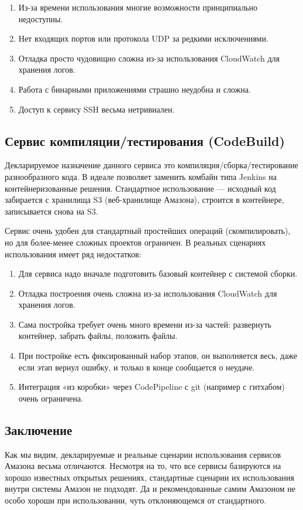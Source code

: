 \documentclass[10pt, a5paper]{article}
\begin{document}
\begin{enumerate}
\item Из-за времени использования многие возможности принципиально
  недоступны.
\item Нет входящих портов или протокола UDP за редкими исключениями.
\item Отладка просто чудовищно сложна из-за использования \linebreak CloudWatch для
  хранения логов.
\item Работа с бинарными приложениями страшно неудобна и сложна.
\item Доступ к сервису SSH весьма нетривиален.
\end{enumerate}

\subsection*{Сервис компиляции/тестирования (CodeBuild)}

Декларируемое назначение данного сервиса это
компиляция/сборка/тестирование разнообразного кода. В идеале позволяет
заменить комбайн типа Jenkins на контейнеризованные решения. Стандартное
использование --- исходный код забирается с хранилища S3 (веб-хранилище
Амазона), строится в контейнере, записывается снова на S3.

Сервис очень удобен для стандартный простейших операций (скомпилировать),
но для более-менее сложных проектов ограничен. В реальных сценариях
использования имеет ряд недостатков:

\begin{enumerate}
\item Для сервиса надо вначале подготовить базовый контейнер с системой
  сборки.
\item Отладка построения очень сложна из-за использования \linebreak CloudWatch для
  хранения логов.
\item Сама постройка требует очень много времени из-за частей: развернуть
  контейнер, забрать файлы, положить файлы.
\item При постройке есть фиксированный набор этапов, он выполняется весь,
  даже если этап вернул ошибку, и только в конце сообщается о неудаче.
\item Интеграция «из коробки» через CodePipeline с git (например с гитхабом)
  очень ограничена.
\end{enumerate}

\subsection*{Заключение}

Как мы видим, декларируемые и реальные сценарии использования сервисов
Амазона весьма отличаются. Несмотря на то, что все сервисы базируются
на хорошо известных открытых решениях, стандартные сценарии их
использования внутри системы Амазон не подходят. Да и рекомендованные
самим Амазоном не особо хороши при использовании, чуть отклоняющемся от стандартного.
\end{document}
